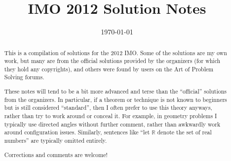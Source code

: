 \documentclass[11pt]{scrartcl}
\title{IMO 2012 Solution Notes}
\date{\today}
\begin{document}
\maketitle

\begin{abstract}
This is a compilation of solutions
for the 2012 IMO.
Some of the solutions are my own work,
but many are from the official solutions provided by the organizers
(for which they hold any copyrights),
and others were found by users on the Art of Problem Solving forums.

These notes will tend to be a bit more advanced and terse than the ``official''
solutions from the organizers.
In particular, if a theorem or technique is not known to beginners
but is still considered ``standard'', then I often prefer to
use this theory anyways, rather than try to work around or conceal it.
For example, in geometry problems I typically use directed angles
without further comment, rather than awkwardly work around configuration issues.
Similarly, sentences like ``let $\mathbb{R}$ denote the set of real numbers''
are typically omitted entirely.

Corrections and comments are welcome!
\end{abstract}

\tableofcontents
\newpage

\addtocounter{section}{-1}
\end{document}
